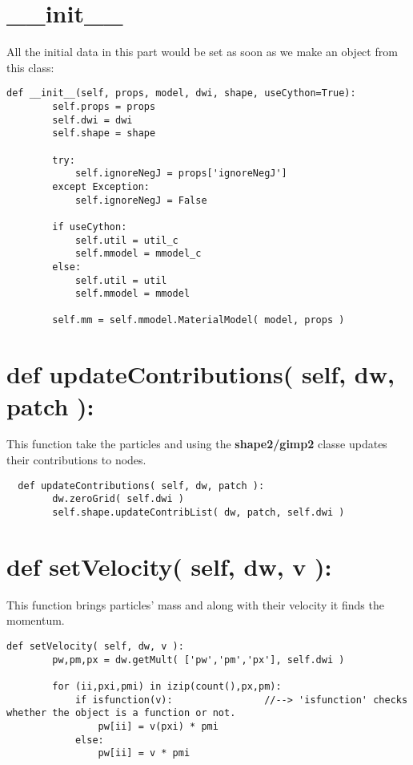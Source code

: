 \documentclass[11pt,fleqn]{book} %
\begin{document}
\section{\_\_init\_\_}
All the initial data in this part would be set as soon as we make an object from this class:
\begin{lstlisting}
def __init__(self, props, model, dwi, shape, useCython=True):
        self.props = props
        self.dwi = dwi
        self.shape = shape
        
        try:
            self.ignoreNegJ = props['ignoreNegJ']
        except Exception:
            self.ignoreNegJ = False
            
        if useCython:
            self.util = util_c
            self.mmodel = mmodel_c
        else:
            self.util = util
            self.mmodel = mmodel
            
        self.mm = self.mmodel.MaterialModel( model, props )
\end{lstlisting}

\section{def updateContributions( self, dw, patch ):}
This function take the particles and using the \textbf{shape2/gimp2} classe updates their contributions to nodes.
\begin{lstlisting}
  def updateContributions( self, dw, patch ):
        dw.zeroGrid( self.dwi )
        self.shape.updateContribList( dw, patch, self.dwi )                
\end{lstlisting}
\section{def setVelocity( self, dw, v ):}
This function brings particles' mass and along with their velocity it finds the momentum.
\begin{lstlisting}
def setVelocity( self, dw, v ):
        pw,pm,px = dw.getMult( ['pw','pm','px'], self.dwi )
        
        for (ii,pxi,pmi) in izip(count(),px,pm):
            if isfunction(v):                //--> 'isfunction' checks whether the object is a function or not. 
                pw[ii] = v(pxi) * pmi
            else:
                pw[ii] = v * pmi              
\end{lstlisting}
\end{document}
